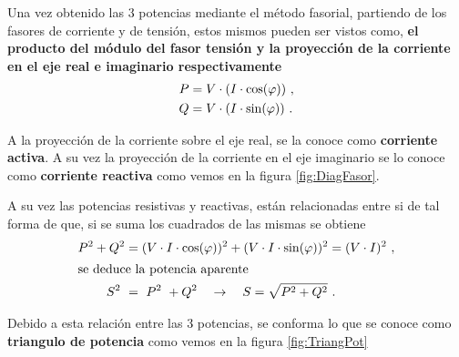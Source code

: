                
            Una vez obtenido las 3 potencias mediante el método fasorial, partiendo de los 
            fasores de corriente y de tensión, estos mismos pueden ser vistos como, \textbf{
            el producto del módulo del fasor tensión y la proyección de la corriente en 
            el eje real e imaginario respectivamente}
               \begin{align}
                  P  &= V \cdot(I\cdot \cos(\varphi)) \ , \notag \\ 
                  Q  &= V \cdot(I\cdot \sin(\varphi)) \ . \notag 
               \end{align}   

            A la proyección de la corriente sobre el eje real, se la conoce como 
            \textbf{corriente activa}. A su vez la proyección de la corriente en el eje 
            imaginario se lo conoce como \textbf{corriente reactiva} como vemos en la 
            figura \ref{fig:DiagFasor}. 

            A su vez las potencias resistivas y reactivas, están relacionadas entre si de 
            tal forma de que, si se suma los cuadrados de las mismas se obtiene
               \begin{align}
                     P^{2} + Q^{2} &=  (V\cdot I\cdot \cos(\varphi))^{2} + (V\cdot I\cdot \sin(\varphi))^{2} = (V\cdot I)^{2} \ , \notag \\
                  \intertext{se deduce la potencia aparente}
                     S^{2}\ &=\ P^{2}\ + Q^{2} \hspace{10pt} \rightarrow \hspace{10pt} S = \sqrt{P^{2} + Q^{2}} \ . \notag
               \end{align}
            
            Debido a esta relación entre las 3 potencias, se conforma lo que se conoce como 
            \textbf{triangulo de potencia} como vemos en la figura \ref{fig:TriangPot}


